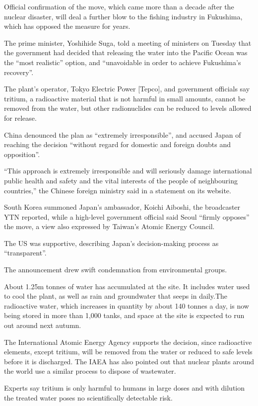 \documentclass[
]{book}
\begin{document}
Official confirmation of the move, which came more than a decade after the nuclear disaster, will deal a further blow to the fishing industry in Fukushima, which has opposed the measure for years.

The prime minister, Yoshihide Suga, told a meeting of ministers on Tuesday that the government had decided that releasing the water into the Pacific Ocean was the ``most realistic'' option, and ``unavoidable in order to achieve Fukushima's recovery''.

The plant's operator, Tokyo Electric Power {[}Tepco{]}, and government officials say tritium, a radioactive material that is not harmful in small amounts, cannot be removed from the water, but other radionuclides can be reduced to levels allowed for release.

China denounced the plan as ``extremely irresponsible'', and accused Japan of reaching the decision ``without regard for domestic and foreign doubts and opposition''.

``This approach is extremely irresponsible and will seriously damage international public health and safety and the vital interests of the people of neighbouring countries,'' the Chinese foreign ministry said in a statement on its website.

South Korea summoned Japan's ambassador, Koichi Aiboshi, the broadcaster YTN reported, while a high-level government official said Seoul ``firmly opposes'' the move, a view also expressed by Taiwan's Atomic Energy Council.

The US was supportive, describing Japan's decision-making process as ``transparent''.

The announcement drew swift condemnation from environmental groups.

About 1.25m tonnes of water has accumulated at the site.
It includes water used to cool the plant, as well as rain and groundwater that seeps in daily.The radioactive water, which increases in quantity by about 140 tonnes a day, is now being stored in more than 1,000 tanks, and space at the site is expected to run out around next autumn.

The International Atomic Energy Agency supports the decision, since radioactive elements, except tritium, will be removed from the water or reduced to safe levels before it is discharged. The IAEA has also pointed out that nuclear plants around the world use a similar process to dispose of wastewater.

Experts say tritium is only harmful to humans in large doses and with dilution the treated water poses no scientifically detectable risk.
\end{document}
